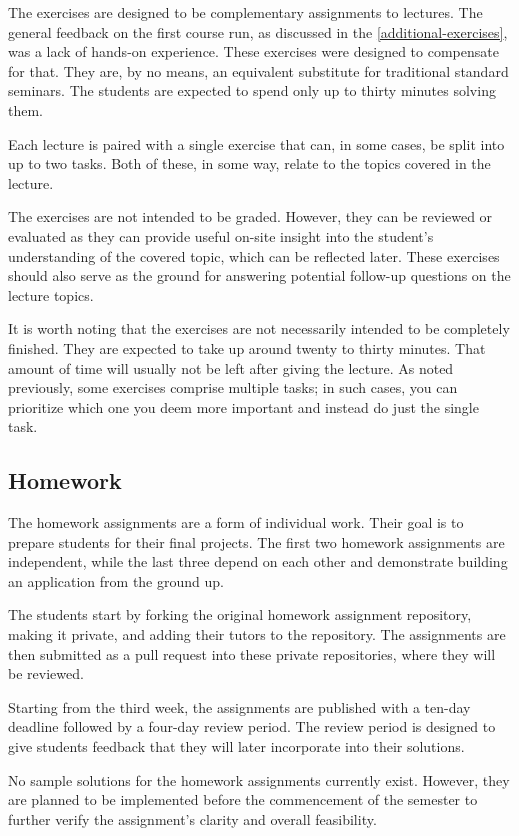 \documentclass[
  digital,
  color,
  oneside,
  nosansbold,
  nocolorbold,
  nolof,
  nolot,
]{fithesis4}
\begin{document}
The exercises are designed to be complementary assignments to lectures. The general feedback on the first course run, as discussed in the \cref{additional-exercises}, was a lack of hands-on experience. These exercises were designed to compensate for that. They are, by no means, an equivalent substitute for traditional standard seminars. The students are expected to spend only up to thirty minutes solving them.

Each lecture is paired with a single exercise that can, in some cases, be split into up to two tasks. Both of these, in some way, relate to the topics covered in the lecture.

The exercises are not intended to be graded. However, they can be reviewed or evaluated as they can provide useful on-site insight into the student's understanding of the covered topic, which can be reflected later. These exercises should also serve as the ground for answering potential follow-up questions on the lecture topics.

It is worth noting that the exercises are not necessarily intended to be completely finished. They are expected to take up around twenty to thirty minutes. That amount of time will usually not be left after giving the lecture. As noted previously, some exercises comprise multiple tasks; in such cases, you can prioritize which one you deem more important and instead do just the single task.

\subsection{Homework}

The homework assignments are a form of individual work. Their goal is to prepare students for their final projects. The first two homework assignments are independent, while the last three depend on each other and demonstrate building an application from the ground up.

The students start by forking the original homework assignment repository, making it private, and adding their tutors to the repository. The assignments are then submitted as a pull request into these private repositories, where they will be reviewed.

Starting from the third week, the assignments are published with a ten-day deadline followed by a four-day review period. The review period is designed to give students feedback that they will later incorporate into their solutions.

No sample solutions for the homework assignments currently exist. However, they are planned to be implemented before the commencement of the semester to further verify the assignment's clarity and overall feasibility.
\end{document}

